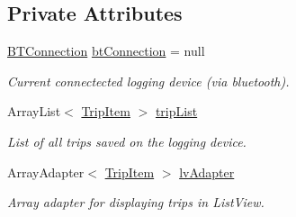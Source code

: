 \subsection*{Private Attributes}
\begin{DoxyCompactItemize}
\item 
\mbox{\label{class_android_app_1_1_load_device_fragment_a245147c7d3683cf1556680a382f328a9}} 
\hyperlink{class_android_app_1_1_b_t_connection}{B\+T\+Connection} \hyperlink{class_android_app_1_1_load_device_fragment_a245147c7d3683cf1556680a382f328a9}{bt\+Connection} = null
\begin{DoxyCompactList}\small\item\em Current connectected logging device (via bluetooth). \end{DoxyCompactList}\item 
\mbox{\label{class_android_app_1_1_load_device_fragment_a23e4856334c9782e15f7f7a08b544f4c}} 
Array\+List$<$ \hyperlink{class_android_app_1_1_trip_item}{Trip\+Item} $>$ \hyperlink{class_android_app_1_1_load_device_fragment_a23e4856334c9782e15f7f7a08b544f4c}{trip\+List}
\begin{DoxyCompactList}\small\item\em List of all trips saved on the logging device. \end{DoxyCompactList}\item 
\mbox{\label{class_android_app_1_1_load_device_fragment_a96c2356cc65e934741c31ff3839ed9d3}} 
Array\+Adapter$<$ \hyperlink{class_android_app_1_1_trip_item}{Trip\+Item} $>$ \hyperlink{class_android_app_1_1_load_device_fragment_a96c2356cc65e934741c31ff3839ed9d3}{lv\+Adapter}
\begin{DoxyCompactList}\small\item\em Array adapter for displaying trips in List\+View. \end{DoxyCompactList}\end{DoxyCompactItemize}
